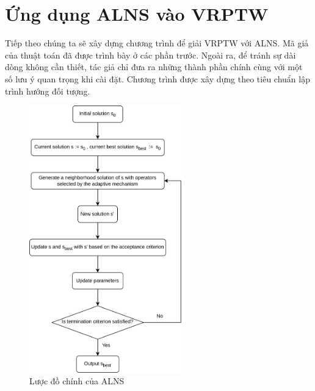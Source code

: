 \chapter{Ứng dụng ALNS vào VRPTW}
\label{chap:application}

Tiếp theo chúng ta sẽ xây dựng chương trình để giải VRPTW với ALNS. Mã giả của thuật toán đã được trình bày ở các phần trước. Ngoài ra, để tránh sự dài dòng không cần thiết, tác giả chỉ đưa ra những thành phần chính cùng với một số lưu ý quan trọng khi cài đặt. Chương trình được xây dựng theo tiêu chuẩn lập trình hướng đối tượng.

\begin{figure}[H] %
  \centering %
  \includegraphics[width=0.6\textwidth]{figures/ALNS-flowchart.png} 
  \caption{Lược đồ chính của ALNS} 
\end{figure}


